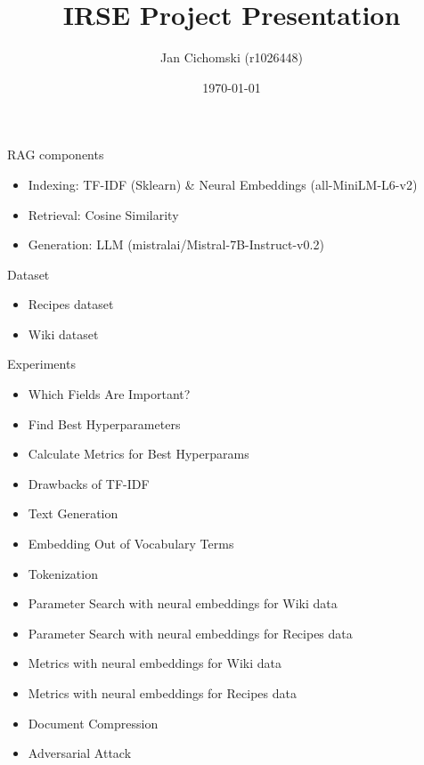 \documentclass{beamer}
\title{IRSE Project Presentation}
\author{Jan Cichomski (r1026448)}
\date{\today}
\begin{document}
\begin{frame}
  \titlepage
\end{frame}

\begin{frame}{RAG components}
  \begin{itemize}
    \item Indexing: TF-IDF (Sklearn) \& Neural Embeddings (all-MiniLM-L6-v2)
    \item Retrieval: Cosine Similarity
    \item Generation: LLM (mistralai/Mistral-7B-Instruct-v0.2)
  \end{itemize}
\end{frame}

\begin{frame}{Dataset}
  \begin{itemize}
    \item Recipes dataset
    \item Wiki dataset
  \end{itemize}
\end{frame}

\begin{frame}{Experiments}
  \begin{itemize}
    \item Which Fields Are Important?
    \item Find Best Hyperparameters
    \item Calculate Metrics for Best Hyperparams
    \item Drawbacks of TF-IDF
    \item Text Generation
    \item Embedding Out of Vocabulary Terms
    \item Tokenization
    \item Parameter Search with neural embeddings for Wiki data
    \item Parameter Search with neural embeddings for Recipes data
    \item Metrics with neural embeddings for Wiki data
    \item Metrics with neural embeddings for Recipes data
    \item Document Compression
    \item Adversarial Attack
  \end{itemize}
\end{frame}

\end{document}
